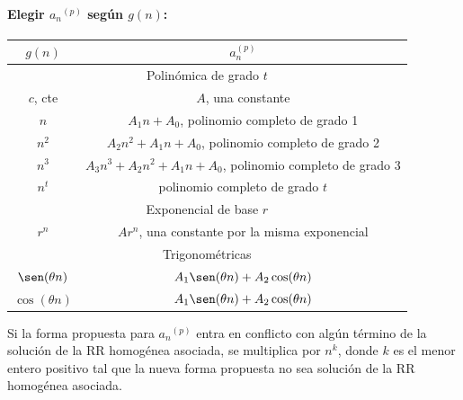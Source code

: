 \documentclass[11pt,a4paper]{article}   %
\begin{document}
\paragraph{Elegir ${a_n}^{(p)}$ según $g(n)$:}
\begin{center}
\begin{tabular}{|c|c|}
\hline
\rowcolor{teal!30} $g(n)$ & $a_n^{(p)}$ \\
\hline
\multicolumn{2}{|c|}{\cellcolor{teal!15} Polinómica de grado $t$} \\
$c$, cte & $A$, una constante \\
$n$ & $A_1 n + A_0$, polinomio completo de grado 1 \\
$n^2$ & $A_2 n^2 + A_1 n + A_0$, polinomio completo de grado 2 \\
$n^3$ & $A_3 n^3 + A_2 n^2 + A_1 n + A_0$, polinomio completo de grado 3 \\
$n^t$ & polinomio completo de grado $t$ \\
\hline
\multicolumn{2}{|c|}{\cellcolor{teal!15} Exponencial de base $r$} \\
$r^n$ & $A r^n$, una constante por la misma exponencial \\
\hline
\multicolumn{2}{|c|}{\cellcolor{teal!15} Trigonométricas} \\
$\sen(\theta n)$ & $A_1 \sen(\theta n) + A_2 \cos(\theta n)$ \\
$\cos(\theta n)$ & $A_1 \sen(\theta n) + A_2 \cos(\theta n)$ \\
\hline
\end{tabular}
\end{center}

\begin{tcolorbox}[colback=yellow!5!white,colframe=yellow!75!black,title=Recordar]
Si la forma propuesta para ${a_n}^{(p)}$ entra en conflicto con algún término de la solución de la RR homogénea asociada, se multiplica por $n^k$,
donde $k$ es el menor entero positivo tal que la nueva forma propuesta no sea solución de la RR homogénea asociada.
\end{tcolorbox}

\end{document}
